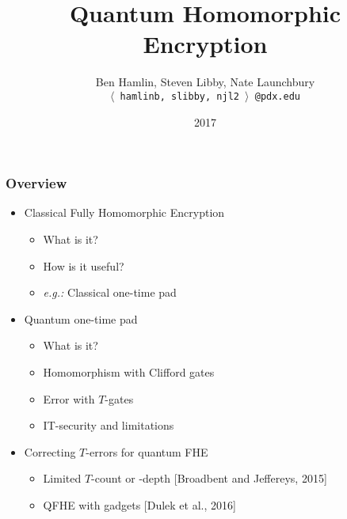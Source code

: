 \documentclass{beamer}
\title{\huge Quantum Homomorphic Encryption}
\author{
Ben Hamlin, Steven Libby, Nate Launchbury
\\ \small \texttt{$\langle$ hamlinb, slibby, njl2 $\rangle$ @pdx.edu}
}
\institute{Portland State University}
\date{2017}
\begin{document}
 
\frame{\titlepage}

\begin{frame}
\frametitle{Overview}
\vfill
\begin{itemize}
\item Classical Fully Homomorphic Encryption
\begin{itemize}
\item What is it?
\item How is it useful?
\item \textit{e.g.:} Classical one-time pad
\end{itemize}
\item Quantum one-time pad
\begin{itemize}
\item What is it?
\item Homomorphism with Clifford gates
\item Error with $T$-gates
\item IT-security and limitations
\end{itemize}
\item Correcting $T$-errors for quantum FHE
\begin{itemize}
\item Limited $T$-count or -depth [Broadbent and Jeffereys, 2015]
\item QFHE with gadgets [Dulek et al., 2016]
\end{itemize}
\end{itemize}
\vfill
\end{frame}




\end{document}
